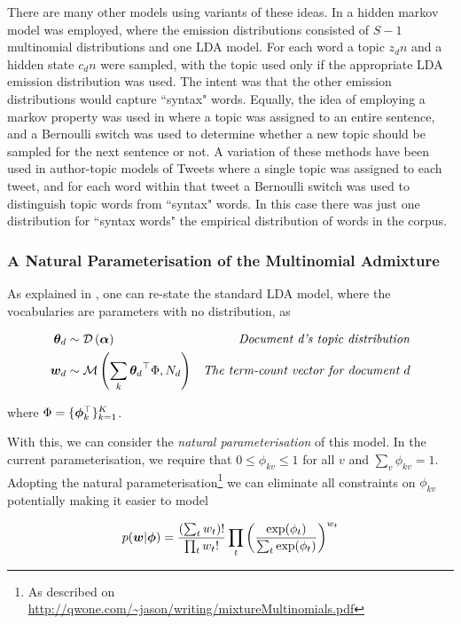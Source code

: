 There are many other models using variants of these ideas. In \cite{Griffiths2005} a hidden markov model was employed, where the emission distributions consisted of $S-1$ multinomial distributions and one LDA model. For each word a topic $z_dn$ and a hidden state $c_dn$ were sampled, with the topic used only if the appropriate LDA emission distribution was used. The intent was that the other emission distributions would capture ``syntax" words. Equally, the idea of employing a markov property was used in \cite{Gruber2007} where a topic was assigned to an entire sentence, and a Bernoulli switch was used to determine whether a new topic should be sampled for the next sentence or not. A variation of these methods have been used in author-topic models\cite{RosenZvi2004} of Tweets\cite{Zhao2011}\cite{Zhao2011a} where a single topic was assigned to each tweet, and for each word within that tweet a Bernoulli switch was used to distinguish topic words from ``syntax" words. In this case there was just one distribution for ``syntax words" the empirical distribution of words in the corpus.




\subsubsection*{A Natural Parameterisation of the Multinomial Admixture}
As explained in \cite{Buntine2002}, one can re-state the standard LDA model, where the vocabularies are parameters with no distribution, as

\begin{align}
{  \bm \theta _d } & \sim \mathcal{D} \left( {\bm \alpha} \right) & \text{\emph{Document d's topic distribution}} \\
\bm w_d & \sim \mathcal{M} \left( {\sum_k { \bm \theta_d }^\top\Phi},{N_d} \right) & \text{\emph{The term-count vector for document $d$}} \label{eqn:lda_convex_combo}
\end{align}

where $\Phi = \{\bm \phi_k^\top\}_{k=1}^{K}$.

With this, we can consider the \emph{natural parameterisation} of this model. In the current parameterisation, we require that $0 \leq \phi_{kv} \leq 1$ for all $v$ and $\sum_v \phi_{kv} = 1$. Adopting the natural parameterisation\footnote{As described on \url{http://qwone.com/~jason/writing/mixtureMultinomials.pdf}} we can eliminate all constraints on $\phi_{kv}$ potentially making it easier to model

\begin{align}
p(\bm w|\bm \phi) = \frac{(\sum_t w_t)!}{\prod_t w_t !} 
\prod_t \left(   
    \frac{\exp(\phi_t)}{\sum_t \exp(\phi_t)}
\right)^{w_t}
\end{align}

